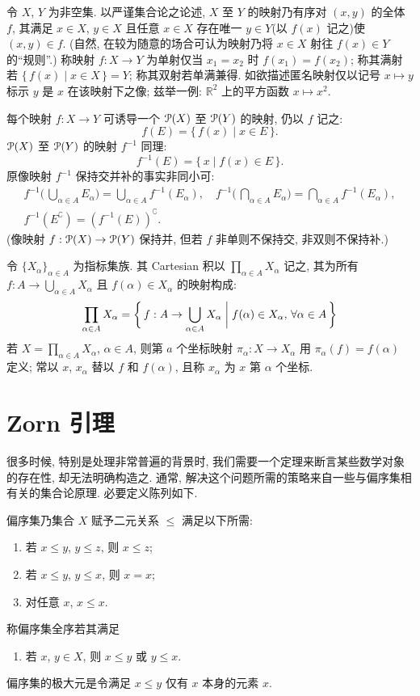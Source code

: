 \documentclass[twoside, fontset=fandol, punct=kaiming]{ctexbook}
\let \mathcal \EuScript
\theoremstyle{innocent}
\begin{document}
令 $X$, $Y$ 为非空集. 以严谨集合论之论述, $X$ 至 $Y$ 的映射乃有序对 $(x,y)$ 的全体 $f$, 其满足 $x\in X$, $y\in X$ 且任意 $x\in X$ 存在唯一 $y\in Y$(以 $f(x)$ 记之)使 $(x,y)\in f$. (自然, 在较为随意的场合可认为映射乃将 $x\in X$ 射往 $f(x)\in Y$ 的``规则''.) 称映射 $f:X\to Y$ 为单射仅当 $x_1=x_2$ 时 $f(x_1)=f(x_2)$; 称其满射若 $\{\,f(x)\mid x\in X\,\}=Y$; 称其双射若单满兼得. 如欲描述匿名映射仅以记号 $x\mapsto y$ 标示 $y$ 是 $x$ 在该映射下之像; 兹举一例: $\mathbb R^2$ 上的平方函数 $x\mapsto x^2$.

每个映射 $f:X\to Y$ 可诱导一个 $\mathcal P(X)$ 至 $\mathcal P(Y)$ 的映射, 仍以 $f$ 记之:
\[f(E)=\{\,f(x)\mid x\in E\,\}.\]
$\mathcal P(X)$ 至 $\mathcal P(Y)$ 的映射 $f^{-1} $ 同理:
\[f^{-1} (E) = \{\,x\mid f(x)\in E\,\}.\]
原像映射 $f^{-1} $ 保持交并补的事实非同小可:
\begin{gather*}
    f^{-1} \biggl(\, \bigcup_{\alpha\in A}E_\alpha \biggr)  = \bigcup_{\alpha\in A}f^{-1} (E_\alpha),\quad
    f^{-1} \biggl(\, \bigcap_{\alpha\in A}E_\alpha \biggr)  = \bigcap_{\alpha\in A}f^{-1} (E_\alpha), \\
    f^{-1} (E^\complement)                               = \left( f^{-1} (E) \right)^\complement.
\end{gather*}
(像映射 $f:\mathcal P(X)\to \mathcal P(Y)$ 保持并, 但若 $f$ 非单则不保持交, 非双则不保持补.)

令 $\{X_\alpha\}_{\alpha\in A}$ 为指标集族. 其 Cartesian 积以 $\prod_{\alpha\in A}X_\alpha$ 记之, 其为所有 $f:A\to \bigcup _{\alpha\in A}X_\alpha$ 且 $f(\alpha)\in X_\alpha$ 的映射构成:
\[\prod_{\alpha\in A}X_\alpha =\biggl\{ \,f:A\to \bigcup _{\alpha\in A}X_\alpha\biggm| f(\alpha)\in X_\alpha,\,\forall \alpha\in A\, \biggr\} \]
若 $X=\prod_{\alpha\in A}X_\alpha$, $\alpha\in A$, 则第 $a$ 个坐标映射 $\pi _\alpha:X\to X_\alpha$ 用 $\pi _\alpha(f)=f(\alpha)$ 定义; 常以 $x$, $x_\alpha$ 替以 $f$ 和 $f(\alpha)$, 且称 $x_\alpha$ 为 $x$ 第 $\alpha$ 个坐标.
\section{Zorn 引理}
很多时候, 特别是处理非常普遍的背景时, 我们需要一个定理来断言某些数学对象的存在性, 却无法明确构造之. 通常, 解决这个问题所需的策略来自一些与偏序集相有关的集合论原理. 必要定义陈列如下.

偏序集乃集合 $X$ 赋予二元关系 $\leqslant $ 满足以下所需:
\begin{enumerate}
    \item 若 $x\leqslant y$, $y\leqslant z$, 则 $x\leqslant z$;
    \item 若 $x\leqslant y$, $y\leqslant x$, 则 $x= x$;
    \item 对任意 $x$, $x\leqslant x$.
\end{enumerate}
称偏序集全序若其满足
\begin{enumerate}[resume]
    \item 若 $x$, $y\in X$, 则 $x\leqslant y$ 或 $y\leqslant x$.
\end{enumerate}
偏序集的极大元是令满足 $x\leqslant y$ 仅有 $x$ 本身的元素 $x$.
\end{document}
